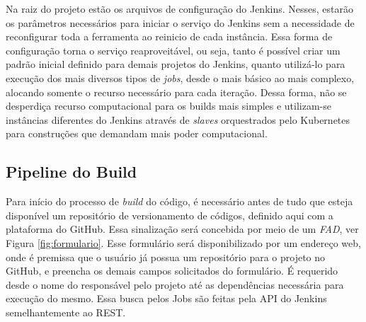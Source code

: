 Na raiz do projeto estão os arquivos de configuração do Jenkins. Nesses, estarão os parâmetros necessários para iniciar o serviço do Jenkins sem a necessidade de reconfigurar toda a ferramenta ao reinicio de cada instância. Essa forma de configuração torna o serviço reaproveitável, ou seja, tanto é possível criar um padrão inicial definido para demais projetos do Jenkins, quanto utilizá-lo para execução dos mais diversos tipos de\textit{ jobs}, desde o mais básico ao mais complexo, alocando somente o recurso necessário para cada iteração. Dessa forma, não se desperdiça recurso computacional para os builds mais simples e utilizam-se instâncias diferentes do Jenkins através de \textit{slaves} orquestrados pelo Kubernetes para construções que demandam mais poder computacional.
    \vspace*{0.5cm}

\subsection{Pipeline do Build}\label{subsection:pipebuild}

Para início do processo de \textit{build} do código, é necessário antes de tudo que esteja disponível um repositório de versionamento de códigos, definido aqui com a plataforma do GitHub. Essa sinalização será concebida por meio de um \textit{FAD}, ver Figura \ref{fig:formulario}. Esse formulário será disponibilizado por um endereço web, onde é premissa que o usuário já possua um repositório para o projeto no GitHub, e preencha os demais campos solicitados do formulário. É requerido desde o nome do responsável pelo projeto até as dependências necessária para execução do mesmo. Essa busca pelos Jobs são feitas pela API do Jenkins semelhantemente ao REST.


